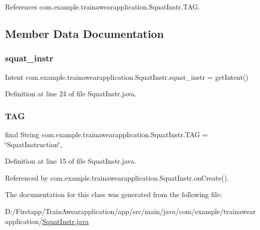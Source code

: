 References com.\+example.\+trainawearapplication.\+Squat\+Instr.\+T\+AG.



\subsection{Member Data Documentation}
\mbox{\label{classcom_1_1example_1_1trainawearapplication_1_1_squat_instr_ae91e424e0c96c8873dfc394e25a0ff2b}} 
\subsubsection{\texorpdfstring{squat\_instr}{squat\_instr}}
{\footnotesize\ttfamily Intent com.\+example.\+trainawearapplication.\+Squat\+Instr.\+squat\+\_\+instr = get\+Intent()\hspace{0.3cm}{\ttfamily [package]}}



Definition at line 24 of file Squat\+Instr.\+java.

\mbox{\label{classcom_1_1example_1_1trainawearapplication_1_1_squat_instr_ad7fe74204afe9fb8319e762c400a9d9d}} 
\subsubsection{\texorpdfstring{TAG}{TAG}}
{\footnotesize\ttfamily final String com.\+example.\+trainawearapplication.\+Squat\+Instr.\+T\+AG = \char`\"{}Squat\+Instruction\char`\"{}\hspace{0.3cm}{\ttfamily [static]}, {\ttfamily [private]}}



Definition at line 15 of file Squat\+Instr.\+java.



Referenced by com.\+example.\+trainawearapplication.\+Squat\+Instr.\+on\+Create().



The documentation for this class was generated from the following file\+:\begin{DoxyCompactItemize}
\item 
D\+:/\+Firstapp/\+Train\+Awearapplication/app/src/main/java/com/example/trainawearapplication/\mbox{\hyperlink{_squat_instr_8java}{Squat\+Instr.\+java}}\end{DoxyCompactItemize}
